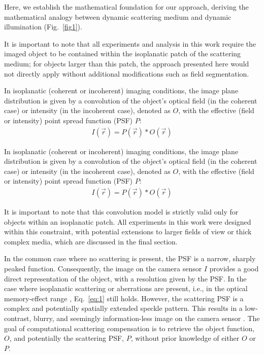 \documentclass[pdflatex,sn-mathphys-num]{sn-jnl}%
\theoremstyle{thmstyleone}%
\theoremstyle{thmstyletwo}%
\theoremstyle{thmstylethree}%
\begin{document}
Here, we establish the mathematical foundation for our approach, deriving the mathematical analogy between dynamic scattering medium and dynamic illumination (Fig.~\ref{fig1}). 

It is important to note that all experiments and analysis in this work require the imaged object to be contained within the isoplanatic patch of the scattering medium; for objects larger than this patch, the approach presented here would not directly apply without additional modifications such as field segmentation.

In isoplanatic (coherent or incoherent) imaging conditions, the image plane distribution is given by a convolution of the object's optical field (in the coherent case) or intensity (in the incoherent case), denoted as $O$, with the effective (field or intensity) point spread function (PSF) $P$:
\begin{eqnarray}
I(\vec{r}) = P(\vec{r}) \ast O (\vec{r})
\label{eq:1}
\end{eqnarray} 

In isoplanatic (coherent or incoherent) imaging conditions, the image plane distribution is given by a convolution of the object's optical field (in the coherent case) or intensity (in the incoherent case), denoted as $O$, with the effective (field or intensity) point spread function (PSF) $P$:
\begin{eqnarray}
I(\vec{r}) = P(\vec{r}) \ast O (\vec{r})
\label{eq:1}
\end{eqnarray}

It is important to note that this convolution model is strictly valid only for objects within an isoplanatic patch. All experiments in this work were designed within this constraint, with potential extensions to larger fields of view or thick complex media, which are discussed in the final section.

In the common case where no scattering is present, the PSF is a narrow, sharply peaked function. Consequently, the image on the camera sensor $I$ provides a good direct representation of the object, with a resolution given by the PSF. %
In the case where isoplanatic scattering or aberrations are present, i.e., in the optical memory-effect range \cite{bertolotti2022imaging}, Eq.~\ref{eq:1} still holds. However, the scattering PSF is a complex and potentially spatially extended speckle pattern. This results in a low-contrast, blurry, and seemingly information-less image on the camera sensor \cite{bertolotti2022imaging}.
The goal of computational scattering compensation is to retrieve the object function, $O$, and potentially the scattering PSF, $P$, without prior knowledge of either $O$ or $P$.
\end{document}
